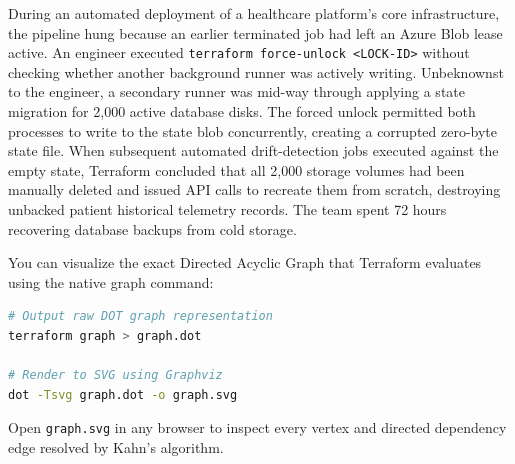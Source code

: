 \begin{realworldbox}
During an automated deployment of a healthcare platform's core infrastructure, the pipeline hung because an earlier terminated job had left an Azure Blob lease active. An engineer executed \texttt{terraform force-unlock <LOCK-ID>} without checking whether another background runner was actively writing. Unbeknownst to the engineer, a secondary runner was mid-way through applying a state migration for 2,000 active database disks. The forced unlock permitted both processes to write to the state blob concurrently, creating a corrupted zero-byte state file. When subsequent automated drift-detection jobs executed against the empty state, Terraform concluded that all 2,000 storage volumes had been manually deleted and issued API calls to recreate them from scratch, destroying unbacked patient historical telemetry records. The team spent 72 hours recovering database backups from cold storage.
\end{realworldbox}

\begin{tryityourselfbox}
You can visualize the exact Directed Acyclic Graph that Terraform evaluates using the native graph command:
\begin{lstlisting}[language=bash]
# Output raw DOT graph representation
terraform graph > graph.dot

# Render to SVG using Graphviz
dot -Tsvg graph.dot -o graph.svg
\end{lstlisting}
Open \texttt{graph.svg} in any browser to inspect every vertex and directed dependency edge resolved by Kahn's algorithm.
\end{tryityourselfbox}

